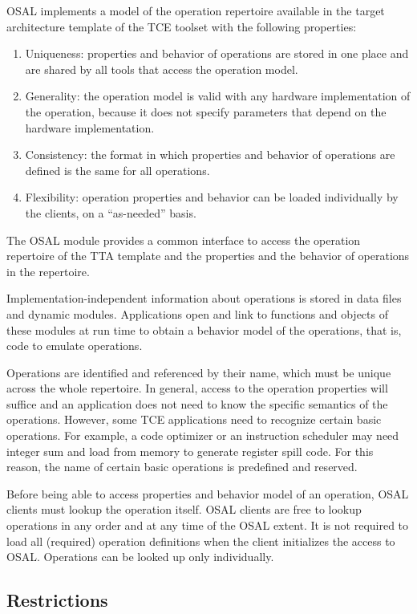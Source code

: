 \documentclass[twoside]{tce}
\begin{document}
OSAL implements a model of the operation repertoire available in the target
architecture template of the TCE toolset with the following properties:
\begin{enumerate}
\item %
  Uniqueness: properties and behavior of operations are stored in one place
  and are shared by all tools that access the operation model.
\item %
  Generality: the operation model is valid with any hardware implementation
  of the operation, because it does not specify parameters that depend on
  the hardware implementation.
\item %
  Consistency: the format in which properties and behavior of operations
  are defined is the same for all operations.
\item %
  Flexibility: operation properties and behavior can be loaded individually
  by the clients, on a ``as-needed'' basis.
\end{enumerate}

The OSAL module provides a common interface to access the operation
repertoire of the TTA template and the properties and the behavior of
operations in the repertoire.

Implementation-independent information about operations is stored in data
files and dynamic modules.  Applications open and link to functions and
objects of these modules at run time to obtain a behavior model of the
operations, that is, code to emulate operations.

Operations are identified and referenced by their name, which must be unique
across the whole repertoire.  In general, access to the operation properties
will suffice and an application does not need to know the specific semantics
of the operations.  However, some TCE applications need to recognize certain
basic operations.  For example, a code optimizer or an instruction scheduler
may need integer sum and load from memory to generate register spill code.
For this reason, the name of certain basic operations is predefined and
reserved.

Before being able to access properties and behavior model of an operation,
OSAL clients must lookup the operation itself.  OSAL clients are free to
lookup operations in any order and at any time of the OSAL extent.  It is
not required to load all (required) operation definitions when the client
initializes the access to OSAL.  Operations can be looked up only
individually.

\subsection{Restrictions}
\end{document}
